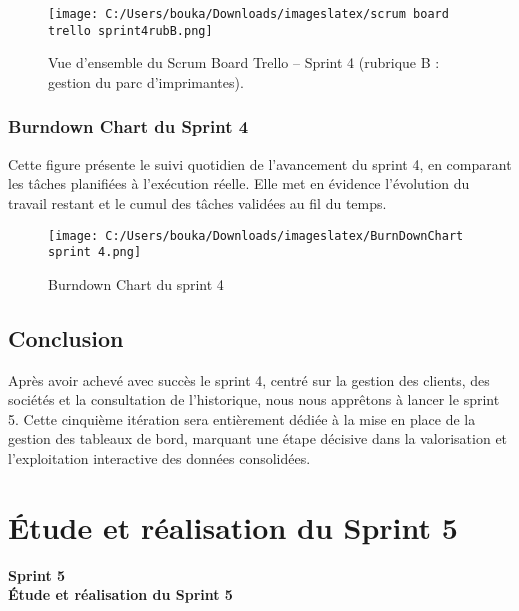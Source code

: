 \documentclass[a4paper,11pt]{report}
\begin{document}
\begin{figure}[H]
  \centering
  \texttt{[image: C:/Users/bouka/Downloads/imageslatex/scrum board trello sprint4rubB.png]}
  \caption{Vue d’ensemble du Scrum Board Trello – Sprint 4 (rubrique B : gestion du parc d’imprimantes).}
  \label{fig:trello-sprint4-printer}
\end{figure}

\newpage
\subsection{Burndown Chart du Sprint 4}

Cette figure présente le suivi quotidien de l’avancement du sprint 4, en comparant les tâches planifiées à l’exécution réelle. Elle met en évidence l’évolution du travail restant et le cumul des tâches validées au fil du temps.

\begin{figure}[ht]
  \centering
  \texttt{[image: C:/Users/bouka/Downloads/imageslatex/BurnDownChart sprint 4.png]}
  \caption{Burndown Chart du sprint 4}
  \label{fig:burndown}
\end{figure}

\section{Conclusion}

Après avoir achevé avec succès le sprint 4, centré sur la gestion des clients, des sociétés et la consultation de l’historique, nous nous apprêtons à lancer le sprint 5. Cette cinquième itération sera entièrement dédiée à la mise en place de la gestion des tableaux de bord, marquant une étape décisive dans la valorisation et l’exploitation interactive des données consolidées.




\chapter{Étude et réalisation du Sprint 5}
\thispagestyle{empty}

\vspace{2cm}
\begin{center}
  {\Huge\bfseries Sprint 5}\\[0.8em]
  {\LARGE\bfseries Étude et réalisation du Sprint 5}
\end{center}
\end{document}
